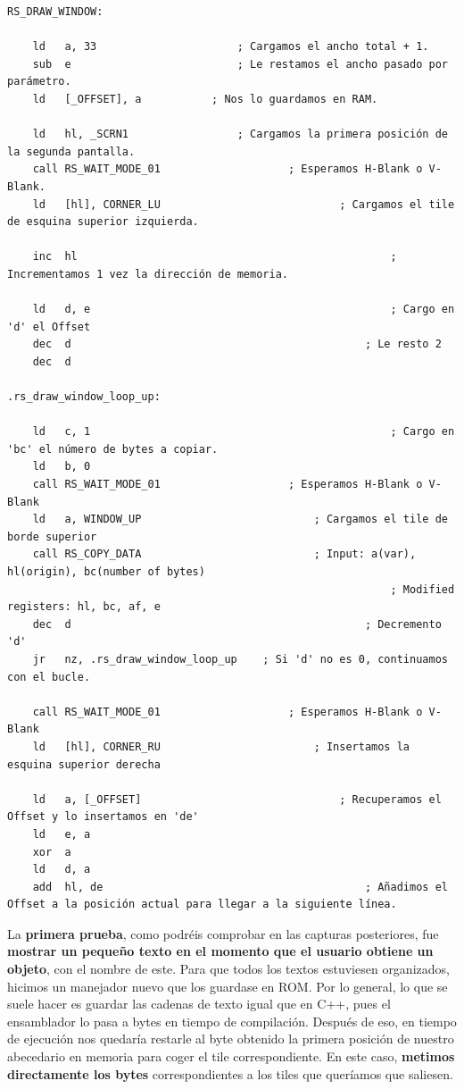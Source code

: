 \begin{lstlisting}[caption={Dibujado de Ventana}, label={code:drawwindow}]
RS_DRAW_WINDOW:

	ld 	 a, 33 						; Cargamos el ancho total + 1.
	sub  e 							; Le restamos el ancho pasado por parámetro.
	ld 	 [_OFFSET], a 			; Nos lo guardamos en RAM.
	
	ld 	 hl, _SCRN1 				; Cargamos la primera posición de la segunda pantalla.
	call RS_WAIT_MODE_01 					; Esperamos H-Blank o V-Blank.
	ld 	 [hl], CORNER_LU 							; Cargamos el tile de esquina superior izquierda.

	inc  hl 												; Incrementamos 1 vez la dirección de memoria.

	ld 	 d, e 												; Cargo en 'd' el Offset
	dec  d 												; Le resto 2
	dec  d

.rs_draw_window_loop_up:

	ld 	 c, 1 												; Cargo en 'bc' el número de bytes a copiar.
	ld 	 b, 0
	call RS_WAIT_MODE_01 					; Esperamos H-Blank o V-Blank
	ld 	 a, WINDOW_UP 							; Cargamos el tile de borde superior
	call RS_COPY_DATA 							; Input: a(var), hl(origin), bc(number of bytes)
															; Modified registers: hl, bc, af, e
	dec  d 												; Decremento 'd'
	jr 	 nz, .rs_draw_window_loop_up 	; Si 'd' no es 0, continuamos con el bucle.
	
	call RS_WAIT_MODE_01 					; Esperamos H-Blank o V-Blank
	ld 	 [hl], CORNER_RU 						; Insertamos la esquina superior derecha
	
	ld 	 a, [_OFFSET] 								; Recuperamos el Offset y lo insertamos en 'de'
	ld 	 e, a
	xor  a
	ld 	 d, a	 
	add  hl, de 										; Añadimos el Offset a la posición actual para llegar a la siguiente línea.
\end{lstlisting}

La \textbf{primera prueba}, como podréis comprobar en las capturas posteriores, fue \textbf{mostrar un pequeño texto en el momento que el usuario obtiene un objeto}, con el nombre de este. Para que todos los textos estuviesen organizados, hicimos un manejador nuevo que los guardase en ROM. Por lo general, lo que se suele hacer es guardar las cadenas de texto igual que en C++, pues el ensamblador lo pasa a bytes en tiempo de compilación. Después de eso, en tiempo de ejecución nos quedaría restarle al byte obtenido la primera posición de nuestro abecedario en memoria para coger el tile correspondiente. En este caso, \textbf{metimos directamente los bytes} correspondientes a los tiles que queríamos que saliesen.

